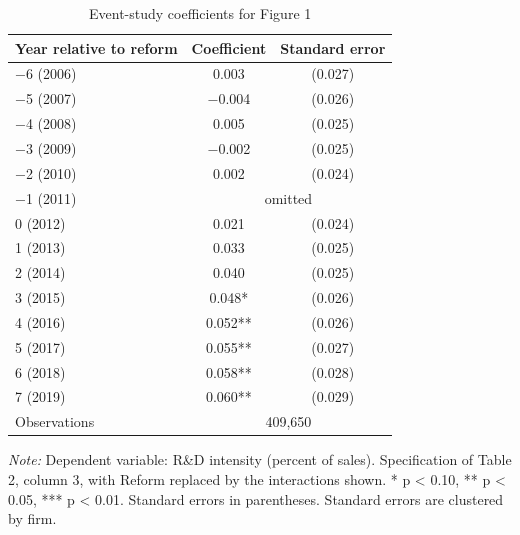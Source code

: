 \documentclass[12pt]{article}
\newcommand{\tabnote}[1]{\par\vspace{2pt}\begin{minipage}{\linewidth}\footnotesize\setstretch{1.0}\textit{Note:} #1\end{minipage}}
\begin{document}
\begin{table}[!htbp]
\centering
\begin{threeparttable}
\caption{Event-study coefficients for Figure 1}
\small
{}
\begin{tabular}{lcc}
\toprule
Year relative to reform & Coefficient & Standard error \\
\midrule
$-$6 (2006) & 0.003 & (0.027) \\
$-$5 (2007) & $-$0.004 & (0.026) \\
$-$4 (2008) & 0.005 & (0.025) \\
$-$3 (2009) & $-$0.002 & (0.025) \\
$-$2 (2010) & 0.002 & (0.024) \\
$-$1 (2011) & \multicolumn{2}{c}{omitted} \\
0 (2012) & 0.021 & (0.024) \\
1 (2013) & 0.033 & (0.025) \\
2 (2014) & 0.040 & (0.025) \\
3 (2015) & 0.048* & (0.026) \\
4 (2016) & 0.052** & (0.026) \\
5 (2017) & 0.055** & (0.027) \\
6 (2018) & 0.058** & (0.028) \\
7 (2019) & 0.060** & (0.029) \\
\midrule
Observations & \multicolumn{2}{c}{409,650} \\
\bottomrule
\end{tabular}
\tabnote{Dependent variable: R\&D intensity (percent of sales). Specification of Table 2, column 3, with Reform replaced by the interactions shown. * p < 0.10, ** p < 0.05, *** p < 0.01. Standard errors in parentheses. Standard errors are clustered by firm.}
\end{threeparttable}
\end{table}
\end{document}
